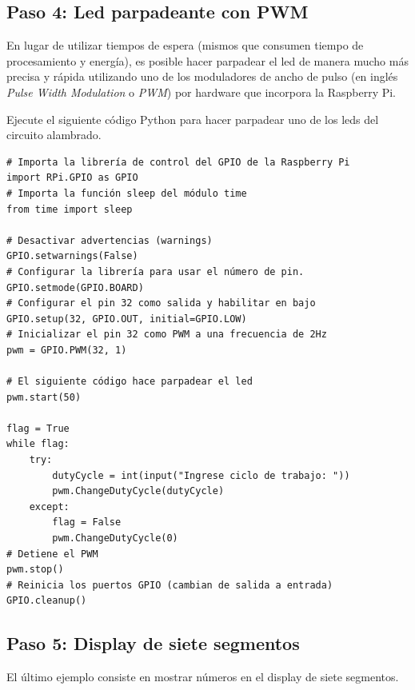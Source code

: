 \documentclass[letterpaper,10.5pt]{article}
\begin{document}
%
%
\subsection{Paso 4: Led parpadeante con PWM}%
\label{sec:step4}
En lugar de utilizar tiempos de espera (mismos que consumen tiempo de procesamiento y energía), es posible hacer parpadear el led de manera mucho más precisa y rápida utilizando uno de los moduladores de ancho de pulso (en inglés \emph{Pulse Width Modulation} o \emph{PWM}) por hardware que incorpora la Raspberry Pi.

Ejecute el siguiente código Python para hacer parpadear uno de los leds del circuito alambrado.

\medskip
\begin{lstlisting}
# Importa la librería de control del GPIO de la Raspberry Pi
import RPi.GPIO as GPIO
# Importa la función sleep del módulo time
from time import sleep

# Desactivar advertencias (warnings)
GPIO.setwarnings(False)
# Configurar la librería para usar el número de pin.
GPIO.setmode(GPIO.BOARD)
# Configurar el pin 32 como salida y habilitar en bajo
GPIO.setup(32, GPIO.OUT, initial=GPIO.LOW)
# Inicializar el pin 32 como PWM a una frecuencia de 2Hz
pwm = GPIO.PWM(32, 1)

# El siguiente código hace parpadear el led
pwm.start(50)

flag = True
while flag:
	try:
		dutyCycle = int(input("Ingrese ciclo de trabajo: "))
		pwm.ChangeDutyCycle(dutyCycle)
	except:
		flag = False
		pwm.ChangeDutyCycle(0)
# Detiene el PWM
pwm.stop()
# Reinicia los puertos GPIO (cambian de salida a entrada)
GPIO.cleanup()
\end{lstlisting}


%
%
\subsection{Paso 5: Display de siete segmentos}%
\label{sec:step5}
El último ejemplo consiste en mostrar números en el display de siete segmentos.
\end{document}
